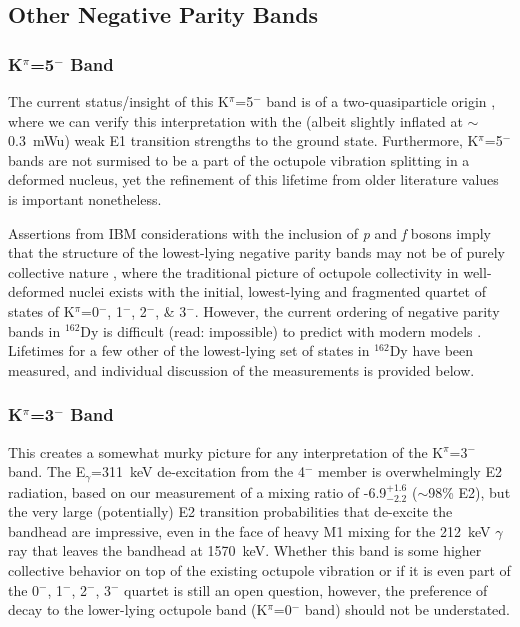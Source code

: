 \subsection{Other Negative Parity Bands}
\subsubsection{K$^\pi$=5$^-$ Band}
The current status/insight of this K$^\pi$=5$^-$ band is of a two-quasiparticle origin \cite{Aprahamian200642}, where we can verify this interpretation with the (albeit slightly inflated at $\sim$0.3~mWu) weak E1 transition strengths to the ground state. Furthermore, K$^\pi$=5$^-$ bands are not surmised to be a part of the octupole vibration splitting in a deformed nucleus, yet the refinement of this lifetime from older literature values is important nonetheless.

Assertions from IBM considerations with the inclusion of \textit{p} and \textit{f} bosons imply that the structure of the lowest-lying negative parity bands may not be of purely collective nature  \cite{Aprahamian200642, Iachello_Arima_IBM}, where the traditional picture of octupole collectivity in well-deformed nuclei exists with the initial, lowest-lying and fragmented quartet of states of K$^\pi$=0$^-$, 1$^-$, 2$^-$, \& 3$^-$. However, the current ordering of negative parity bands in $^{162}$Dy is difficult (read: impossible) to predict with modern models \cite{Aprahamian200642}. Lifetimes for a few other of the lowest-lying set of states in $^{162}$Dy have been measured, and individual discussion of the measurements is provided below.

\subsubsection{K$^\pi$=3$^-$ Band}
This creates a somewhat murky picture for any interpretation of the K$^\pi$=3$^-$ band. The E$_\gamma$=311~keV de-excitation from the 4$^-$ member is overwhelmingly E2 radiation, based on our measurement of a mixing ratio of -6.9$^{+1.6}_{-2.2}$ ($\sim$98\% E2), but the very large (potentially) E2 transition probabilities that de-excite the bandhead are impressive, even in the face of heavy M1 mixing for the 212~keV $\gamma$ ray that leaves the bandhead at 1570~keV. Whether this band is some higher collective behavior on top of the existing octupole vibration or if it is even part of the 0$^-$, 1$^-$, 2$^-$, 3$^-$ quartet is still an open question, however, the preference of decay to the lower-lying octupole band (K$^\pi$=0$^-$ band) should not be understated.
